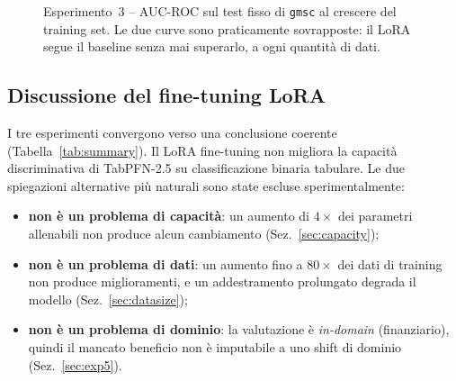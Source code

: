 \documentclass[11pt,a4paper]{article}
\begin{document}
\begin{figure}[h]
\centering
{}
\caption{Esperimento~3 -- AUC-ROC sul test fisso di \texttt{gmsc} al crescere del
training set. Le due curve sono praticamente sovrapposte: il LoRA segue il
baseline senza mai superarlo, a ogni quantità di dati.}
\label{fig:datasize}
\end{figure}

\subsection{Discussione del fine-tuning LoRA}
\label{sec:lora-discussione}
I tre esperimenti convergono verso una conclusione coerente
(Tabella~\ref{tab:summary}). Il LoRA fine-tuning non migliora la capacità
discriminativa di TabPFN-2.5 su classificazione binaria tabulare. Le due
spiegazioni alternative più naturali sono state escluse sperimentalmente:
\begin{itemize}[nosep]
  \item \textbf{non è un problema di capacità}: un aumento di $4\times$ dei
  parametri allenabili non produce alcun cambiamento (Sez.~\ref{sec:capacity});
  \item \textbf{non è un problema di dati}: un aumento fino a $80\times$ dei dati
  di training non produce miglioramenti, e un addestramento prolungato degrada il
  modello (Sez.~\ref{sec:datasize});
  \item \textbf{non è un problema di dominio}: la valutazione è \emph{in-domain}
  (finanziario), quindi il mancato beneficio non è imputabile a uno shift di
  dominio (Sez.~\ref{sec:exp5}).
\end{itemize}
\end{document}
